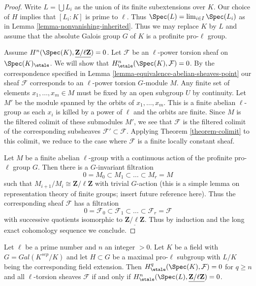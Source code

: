 \begin{proof}
Write $L = \bigcup L_i$ as the union of its finite subextensions over $K$.
Our choice of $H$ implies that $[L_i : K]$ is prime to $\ell$.
Thus $\Spec(L) = \lim_{i \in I} \Spec(L_i)$ as in
Lemma \ref{lemma-nonvanishing-inherited}.
Thus we may replace $K$ by $L$ and assume that
the absolute Galois group $G$ of $K$ is a
profinite pro-$\ell$ group.

\medskip\noindent
Assume $H^n(\Spec(K), \underline{\mathbf{Z}/\ell\mathbf{Z}}) = 0$.
Let $\mathcal{F}$ be an $\ell$-power torsion sheaf on $\Spec(K)_\etale$.
We will show that $H^n_\etale(\Spec(K), \mathcal{F}) = 0$.
By the correspondence specified in
Lemma \ref{lemma-equivalence-abelian-sheaves-point}
our sheaf $\mathcal{F}$ corresponds to an $\ell$-power torsion
$G$-module $M$. Any finite set of elements $x_1, \ldots, x_m \in M$
must be fixed by an open subgroup $U$ by continuity.
Let $M'$ be the module spanned by the orbits of $x_1, \ldots, x_m$.
This is a finite abelian $\ell$-group
as each $x_i$ is killed by a power of $\ell$
and the orbits are finite. Since $M$ is the filtered colimit of
these submodules $M'$, we see that $\mathcal{F}$ is the filtered
colimit of the corresponding subsheaves $\mathcal{F}' \subset \mathcal{F}$.
Applying Theorem \ref{theorem-colimit} to this colimit, we reduce
to the case where $\mathcal{F}$ is a finite locally constant sheaf.

\medskip\noindent
Let $M$ be a finite abelian $\ell$-group with a continuous action
of the profinite pro-$\ell$ group $G$. Then there is a $G$-invariant
filtration
$$
0 = M_0 \subset M_1 \subset \ldots \subset M_r = M
$$
such that $M_{i + 1}/M_i \cong \mathbf{Z}/\ell \mathbf{Z}$ with
trivial $G$-action (this is a simple lemma on representation
theory of finite groups; insert future reference here).
Thus the corresponding sheaf $\mathcal{F}$ has a filtration
$$
0 = \mathcal{F}_0 \subset \mathcal{F}_1 \subset \ldots \subset
\mathcal{F}_r = \mathcal{F}
$$
with successive quotients isomorphic to
$\underline{\mathbf{Z}/\ell \mathbf{Z}}$.
Thus by induction and the long exact cohomology
sequence we conclude.
\end{proof}

\begin{lemma}
\label{lemma-reduce-to-l-group-higher}
Let $\ell$ be a prime number and $n$ an integer $> 0$.
Let $K$ be a field with $G = Gal(K^{sep}/K)$ and let
$H \subset G$ be a maximal pro-$\ell$ subgroup 
with $L/K$ being the corresponding field extension.
Then $H^q_\etale(\Spec(K),\mathcal{F}) = 0$ for $q \geq n$ and all
$\ell$-torsion sheaves $\mathcal{F}$ if  and only if
$H^n_\etale(\Spec(L), \underline{\mathbf{Z}/\ell\mathbf{Z}}) = 0$.
\end{lemma}

